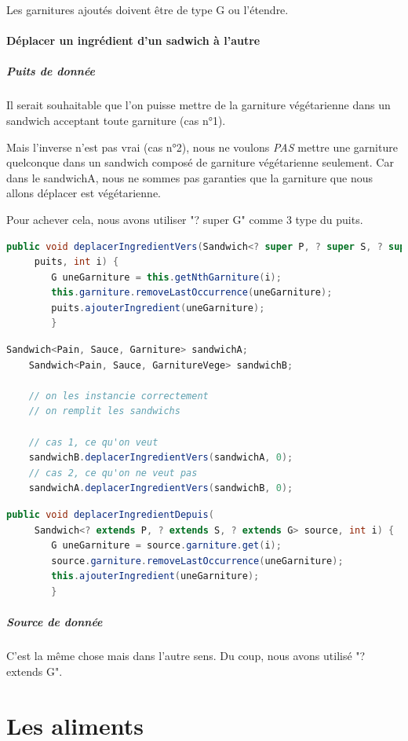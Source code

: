 \documentclass[a4paper]{article}
\begin{document}
Les garnitures ajoutés doivent être de type G ou l'étendre.
\clearpage
\paragraph{Déplacer un ingrédient d'un sadwich à l'autre}
\subparagraph{Puits de donnée}
Il serait souhaitable que l'on puisse mettre de la garniture végétarienne dans un 
sandwich acceptant toute garniture (cas n°1). 

Mais l'inverse n'est pas vrai 
(cas n°2), nous ne voulons \emph{PAS} mettre une garniture quelconque dans un 
sandwich composé de garniture végétarienne seulement. Car dans le sandwichA, nous 
ne sommes pas garanties que la garniture que nous allons déplacer est végétarienne.

Pour achever cela, nous avons utiliser "? super G" comme 3 type du puits.
\begin{lstlisting}[language=Java, caption=Déplacer l'ingrédient d'indice i depuis this aux puits]
    public void deplacerIngredientVers(Sandwich<? super P, ? super S, ? super G>
     puits, int i) {
        G uneGarniture = this.getNthGarniture(i);
        this.garniture.removeLastOccurrence(uneGarniture);
        puits.ajouterIngredient(uneGarniture);
        }
\end{lstlisting}
\begin{lstlisting}[language=Java, caption=Exemple puis de donnée]
    Sandwich<Pain, Sauce, Garniture> sandwichA;
    Sandwich<Pain, Sauce, GarnitureVege> sandwichB;
    
    // on les instancie correctement
    // on remplit les sandwichs
        
    // cas 1, ce qu'on veut 
    sandwichB.deplacerIngredientVers(sandwichA, 0);
    // cas 2, ce qu'on ne veut pas
    sandwichA.deplacerIngredientVers(sandwichB, 0); 
\end{lstlisting}
\begin{lstlisting}[language=Java, caption=Déplacer l'ingrédient d'indice i du puits jusqu'à this]
    public void deplacerIngredientDepuis(
     Sandwich<? extends P, ? extends S, ? extends G> source, int i) {
        G uneGarniture = source.garniture.get(i);
        source.garniture.removeLastOccurrence(uneGarniture);
        this.ajouterIngredient(uneGarniture);
        }
\end{lstlisting}
\subparagraph{Source de donnée}
C'est la même chose mais dans l'autre sens. Du coup, nous avons utilisé "? extends G".

\clearpage
\section{Les aliments}
\end{document}
